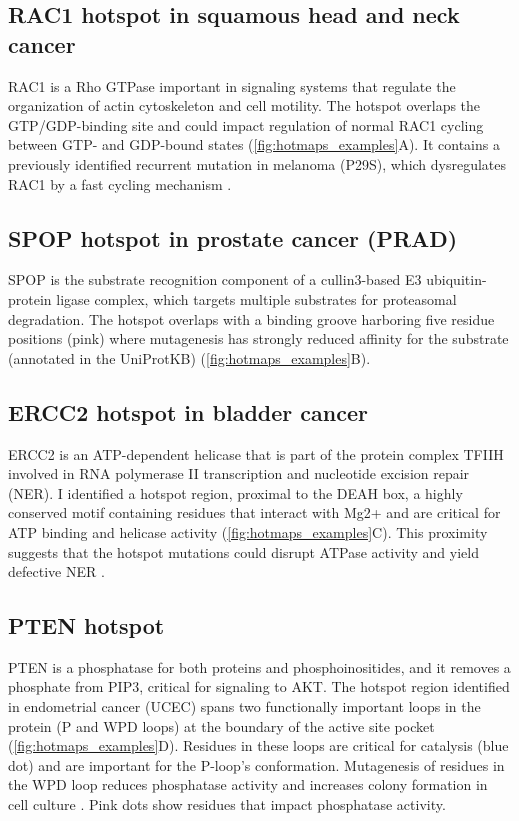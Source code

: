 \subsection{RAC1 hotspot in squamous head and neck cancer}
RAC1 is a Rho GTPase important in signaling systems that regulate the organization of actin cytoskeleton and cell motility. The hotspot overlaps the GTP/GDP-binding site and could impact regulation of normal RAC1 cycling between GTP- and GDP-bound states (\autoref{fig:hotmaps_examples}A). It contains a previously identified recurrent mutation in melanoma (P29S), which dysregulates RAC1 by a fast cycling mechanism \cite{RN124}.

\subsection{SPOP hotspot in prostate cancer (PRAD)}
SPOP is the substrate recognition component of a cullin3-based E3 ubiquitin-protein ligase complex, which targets multiple substrates for proteasomal degradation. The hotspot overlaps with a binding groove harboring five residue positions (pink) where mutagenesis has strongly reduced affinity for the substrate (annotated in the UniProtKB) (\autoref{fig:hotmaps_examples}B).

\subsection{ERCC2 hotspot in bladder cancer}
ERCC2 is an ATP-dependent helicase that is part of the protein complex TFIIH involved in RNA polymerase II transcription and nucleotide excision repair (NER). I identified a hotspot region, proximal to the DEAH box, a highly conserved motif containing residues that interact with Mg2+ and are critical for ATP binding and helicase activity (\autoref{fig:hotmaps_examples}C). This proximity suggests that the hotspot mutations could disrupt ATPase activity and yield defective NER \cite{RN125}.

\subsection{PTEN hotspot}
PTEN is a phosphatase for both proteins and phosphoinositides, and it removes a phosphate from PIP3, critical for signaling to AKT. The hotspot region identified in endometrial cancer (UCEC) spans two functionally important loops in the protein (P and WPD loops) at the boundary of the active site pocket (\autoref{fig:hotmaps_examples}D). Residues in these loops are critical for catalysis (blue dot) and are important for the P-loop's conformation. Mutagenesis of residues in the WPD loop reduces phosphatase activity and increases colony formation in cell culture \cite{RN126}. Pink dots show residues that impact phosphatase activity.

